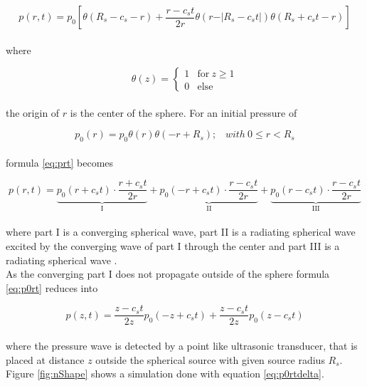 \begin{equation}
p(r,t) = p_0 \left[\theta(R_s - c_s -r) + \frac{r-c_s t}{2r} \theta(r-\vert R_s - c_s t\vert) \theta(R_s + c_s t - r)\right]
\label{eq:prt}
\end{equation}
\\
where 

\begin{equation}
\theta(z) =
\begin{cases}
1 &  \mathrm{for}~z \geq 1\\
0 & \mathrm{else}
\end{cases}
\label{eq:theta}
\end{equation}
\\
the origin of $r$ is the center of the sphere. For an initial pressure of

\begin{equation}
p_0(r) = p_0\theta(r)\theta(-r + R_s);\;\;\;with~ 0\le r < R_s
\end{equation}
\\
formula \ref{eq:prt} becomes

\begin{equation}
p(r,t) = \underbrace{p_0(r+c_st) \cdot \frac{r+c_s t}{2r}}_{\mathrm{I}}+ \underbrace{p_0(-r+c_st) \cdot \frac{r-c_s t}{2r}}_{\mathrm{II}}+\underbrace{p_0(r-c_st) \cdot \frac{r-c_s t}{2r}}_{\mathrm{III}}
\label{eq:p0rt}
\end{equation}
\\
where part I is a converging spherical wave, part II is a radiating spherical wave excited by the converging wave of part I through the center and part III is a radiating spherical wave \cite{Wang:PAMtutorial}.\\
As the converging part I does not propagate outside of the sphere formula \ref{eq:p0rt} reduces into

\begin{equation}
p(z,t) = \frac{z-c_s t}{2z} p_0(-z+c_s t) + \frac{z-c_s t}{2z} p_0(z-c_s t)
\label{eq:p0rtdelta}
\end{equation}
\\
where the pressure wave is detected by a point like ultrasonic transducer, that is placed at distance $z$ outside the spherical source with given source radius $R_s$. \\
Figure \ref{fig:nShape} shows a simulation done with equation \ref{eq:p0rtdelta}.

